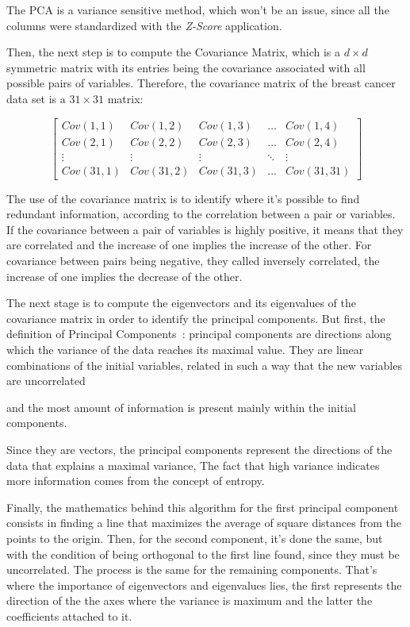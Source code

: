 \documentclass[conference]{IEEEtran}
\begin{document}
The PCA is a variance sensitive method, which won't be an issue, since all the columns were standardized with the \textit{Z-Score} application. 

Then, the next step is to compute the Covariance Matrix, which is a $d \times d$ symmetric matrix with its entries being the covariance associated with all possible pairs of variables. Therefore, the covariance matrix of the breast cancer data set is a $31 \times 31$ matrix: 

\[
\begin{bmatrix}
    Cov(1,1) & Cov(1,2) & Cov(1,3) & \dots  & Cov(1,4) \\
    Cov(2,1) & Cov(2,2) & Cov(2,3) & \dots  & Cov(2,4) \\
    \vdots & \vdots & \vdots & \ddots & \vdots \\
    Cov(31,1) & Cov(31,2) & Cov(31,3) & \dots  & Cov(31,31)
\end{bmatrix}
\]

The use of the covariance matrix is to identify where it's possible to find redundant 
information, according to the correlation between a pair or variables. If the 
covariance between a pair of variables is highly positive, it means that they are 
correlated and the increase of one implies the increase of the other. For covariance 
between pairs being negative, they called inversely correlated, the increase of one 
implies the decrease of the other.

The next stage is to compute the eigenvectors and its eigenvalues of the covariance 
matrix in order to identify the principal components. But first, the definition of 
Principal Components~\cite{Ringner2001}: principal components are directions along which 
the variance of the data reaches its maximal value. They are linear combinations of 
the initial variables, related in such a way that the new variables are uncorrelated 

and the most amount of information is present mainly within the initial components.

Since they are vectors, the principal components represent the directions of the data 
that explains a maximal variance, The fact that high variance indicates more 
information comes from the concept of entropy. 

Finally, the mathematics behind this algorithm for the first principal component 
consists in finding a line that maximizes the average of square distances from the 
points to the origin. Then, for the second component, it's done the same, but with 
the condition of being orthogonal to the first line found, since they must be uncorrelated. The process is the same for the remaining components. That's where the importance of eigenvectors and eigenvalues lies, the first represents the direction of the the axes where the variance is maximum and the latter the coefficients attached to it. 
\end{document}
